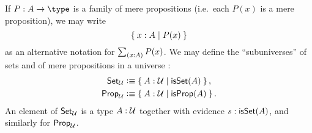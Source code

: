 \documentclass[hott-all.tex]{subfiles}
\begin{document}
\label{defn:setof}%
If $P:A\to \type$ is a family of mere propositions (i.e.\ each $P(x)$ is a mere proposition), we may write
%
\begin{equation}
  \label{eq:subset}
  \setof{x:A | P(x)}
\end{equation}
%
as an alternative notation for $\sm{x:A} P(x)$.
%
%
%
We may define the ``subuniverses'' of sets and of mere propositions in a universe \UU:
\begin{align*}
  \setU &\defeq \setof{A:\UU | \isset(A) },\\
  \propU &\defeq \setof{A:\UU | \isprop(A) }.
\end{align*}
An element of $\mathsf{Set}_\mathcal{U}$ is a type $A:\mathcal{U}$ together with evidence $s:\mathsf{isSet}(A)$, and similarly for $\mathsf{Prop}_\mathcal{U}$.
%
\end{document}
